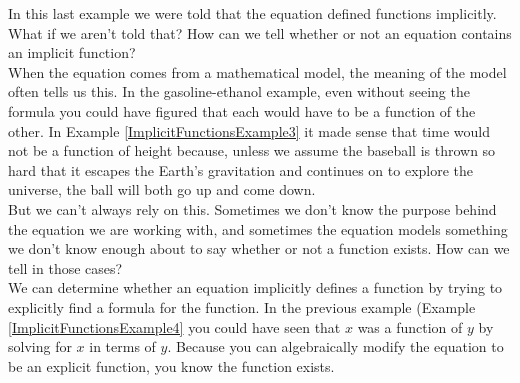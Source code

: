 

\bigskip

In this last example we were told that the equation defined functions implicitly. What if we aren’t told that? How can we tell whether or not an equation contains an implicit function? \\

When the equation comes from a mathematical model, the meaning of the model often tells us this. In the gasoline-ethanol example, even without seeing the formula you could have figured that each would have to be a function of the other. In Example \ref{ImplicitFunctionsExample3} it made sense that time would not be a function of height because, unless we assume the baseball is thrown so hard that it escapes the Earth’s gravitation and continues on to explore the universe, the ball will both go up and come down.\\

But we can’t always rely on this. Sometimes we don’t know the purpose behind the equation we are working with, and sometimes the equation models something we don’t know enough about to say whether or not a function exists. How can we tell in those cases?\\

We can determine whether an equation implicitly defines a function by trying to explicitly find a formula for the function. In the previous example (Example \ref{ImplicitFunctionsExample4} you could have seen that $x$ was a function of $y$ by solving for $x$ in terms of $y$. Because you can algebraically modify the equation to be an explicit function, you know the function exists.


